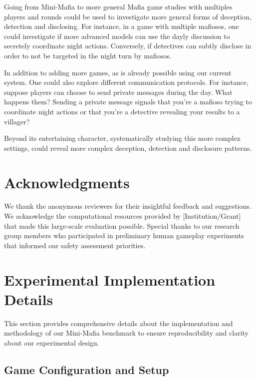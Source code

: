 \documentclass{article}
\begin{document}
Going from Mini-Mafia to more general Mafia game studies with multiples players and rounds could be used to investigate more general forms of deception, detection and disclosing. For instance, in a game with multiple mafiosos, one could investigate if more advanced models can use the dayly discussion to secretely coordinate night actions. Conversely, if detectives can subtly disclose in order to not be targeted in the night turn by mafiosos. 

In addition to adding more games, as is already possible using our current system. One could also explore different communication protocols. For instance, suppose players can choose to send private messages during the day. What happens them? Sending a private message signals that you're a mafioso trying to coordinate night actions or that you're a detective revealing your results to a villager?

Beyond its entertaining character, systematically studying this more complex settings, could reveal more complex deception, detection and disclosure patterns.


\section*{Acknowledgments}

We thank the anonymous reviewers for their insightful feedback and suggestions. We acknowledge the computational resources provided by [Institution/Grant] that made this large-scale evaluation possible. Special thanks to our research group members who participated in preliminary human gameplay experiments that informed our safety assessment priorities.







\appendix

\section{Experimental Implementation Details}
\label{appendix:experimental_details}

This section provides comprehensive details about the implementation and methodology of our Mini-Mafia benchmark to ensure reproducibility and clarity about our experimental design.

\subsection{Game Configuration and Setup}
\end{document}
